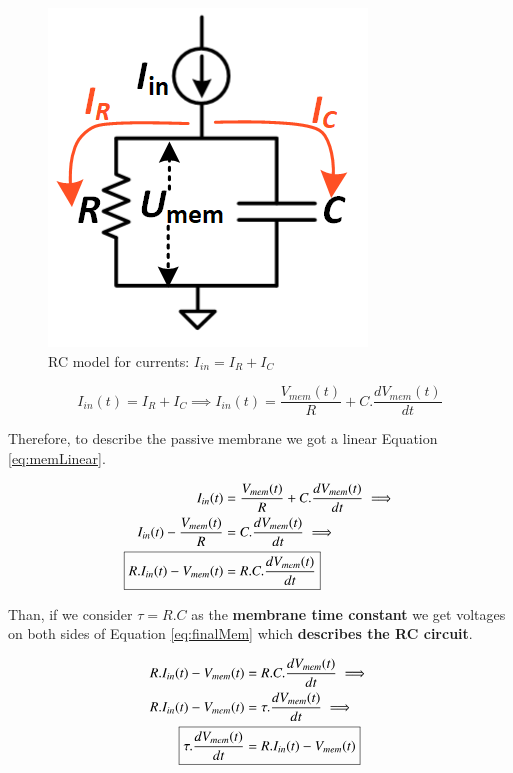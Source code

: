 			\begin{multicols}{2}
			
				\begin{figure}[H]
					\centering
					\includegraphics[width=0.4\linewidth]{images/rcmodel2}
					\caption[RC model for currents]{RC model for currents: $I_{in} = I_R + I_C$}
					\label{fig:rcmodel2}
				\end{figure}
			
			\columnbreak
		
				\begin{equation}
					\label{eq:totalNeuronCurrent}
					I_{in}(t) = I_R + I_C \implies I_{in}(t) = \frac{V_{mem}(t)}{R} + C.\dfrac{dV_{mem}(t)}{dt}
				\end{equation}
			\end{multicols}
		
			\par Therefore, to describe the passive membrane we got a linear Equation \ref{eq:memLinear}.
			
			\begin{equation}
				\label{eq:memLinear}
				\begin{aligned}
					I_{in}(t) &= \frac{V_{mem}(t)}{R} + C.\dfrac{dV_{mem}(t)}{dt} \implies \\ 
					I_{in}(t) - \frac{V_{mem}(t)}{R} &=  C.\dfrac{dV_{mem}(t)}{dt} \implies \\
					\Aboxed{R.I_{in}(t) - V_{mem}(t) &=  R.C.\dfrac{dV_{mem}(t)}{dt}}
				\end{aligned}
			\end{equation}
		
			\par Than, if we consider $\tau = R.C$ as the \textbf{membrane time constant} we get voltages on both sides of Equation \ref{eq:finalMem} which \textbf{describes the RC circuit}.
			
			\begin{equation}
				\label{eq:finalMem}
				\begin{aligned}
				R.I_{in}(t) - V_{mem}(t) &=  R.C.\dfrac{dV_{mem}(t)}{dt} \implies \\
				R.I_{in}(t) - V_{mem}(t) &=  \tau.\dfrac{dV_{mem}(t)}{dt} \implies \\
				\Aboxed{\tau.\dfrac{dV_{mem}(t)}{dt} &= R.I_{in}(t) - V_{mem}(t)}
				\end{aligned}
			\end{equation}
		
